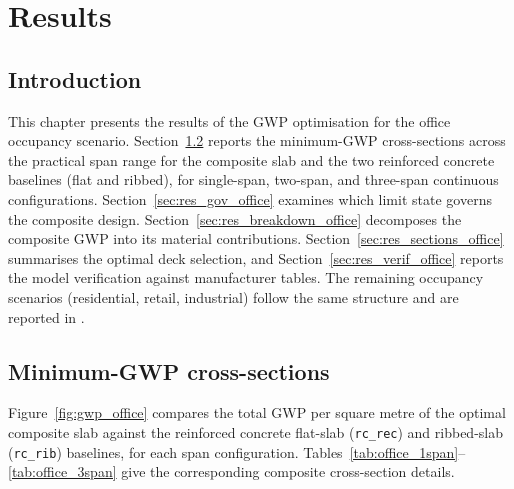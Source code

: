 \section{Results}
\label{fourthchapter}

\subsection{Introduction}
This chapter presents the results of the GWP optimisation for the office occupancy scenario. Section~\ref{sec:res_gwp_office} reports the minimum-GWP cross-sections across the practical span range for the composite slab and the two reinforced concrete baselines (flat and ribbed), for single-span, two-span, and three-span continuous configurations. Section~\ref{sec:res_gov_office} examines which limit state governs the composite design. Section~\ref{sec:res_breakdown_office} decomposes the composite GWP into its material contributions. Section~\ref{sec:res_sections_office} summarises the optimal deck selection, and Section~\ref{sec:res_verif_office} reports the model verification against manufacturer tables. The remaining occupancy scenarios (residential, retail, industrial) follow the same structure and are reported in .

\subsection{Minimum-GWP cross-sections}
\label{sec:res_gwp_office}
Figure~\ref{fig:gwp_office} compares the total GWP per square metre of the optimal composite slab against the reinforced concrete flat-slab (\texttt{rc\_rec}) and ribbed-slab (\texttt{rc\_rib}) baselines, for each span configuration. Tables~\ref{tab:office_1span}--\ref{tab:office_3span} give the corresponding composite cross-section details.


